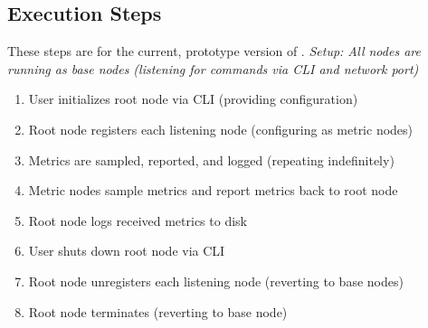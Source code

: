 \subsection{Execution Steps}
These steps are for the current, prototype version of \dcamp. \textit{Setup: All nodes are running as base nodes (listening for commands via CLI and network port)}
\begin{enumerate}
\item User initializes root node via CLI (providing configuration) 
\item Root node registers each listening node (configuring as metric nodes) 
\item Metrics are sampled, reported, and logged (repeating indefinitely) 
\item Metric nodes sample metrics and report metrics back to root node 
\item Root node logs received metrics to disk 
\item User shuts down root node via CLI 
\item Root node unregisters each listening node (reverting to base nodes) 
\item Root node terminates (reverting to base node)
\end{enumerate}

